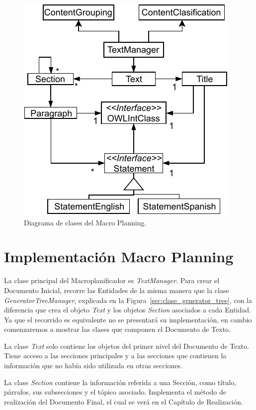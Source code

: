 \begin{figure}
    \centering
    \includegraphics{img/generacion_documento/diagrama_clases_macroplanificador.pdf}
    \caption{Diagrama de clases del Macro Planning.}
    \label{fig:diagrama_clases_macroplanificador}
\end{figure}

\section{Implementación Macro Planning}
La clase principal del Macroplanificador es \emph{TextManager}. Para crear el Documento Inicial, recorre las Entidades de la misma manera que la clase \emph{GeneratorTreeManager}, explicada en la Figura~\ref{sec:clase_generator_tree}, con la diferencia que crea el objeto \emph{Text} y los objetos \emph{Section} asociados a cada Entidad. Ya que el recorrido es equivalente no se presentará su implementación, en cambio comenzaremos a mostrar las clases que componen el Documento de Texto.

La clase \emph{Text} solo contiene los objetos del primer nivel del Documento de Texto. Tiene acceso a las secciones principales y a las secciones que contienen la información que no había sido utilizada en otras secciones. 

La clase \emph{Section} contiene la información referida a una Sección, como título, párrafos, sus subsecciones y el tópico asociado. Implementa el método de realización del Documento Final, el cual se verá en el Capítulo de Realización.

